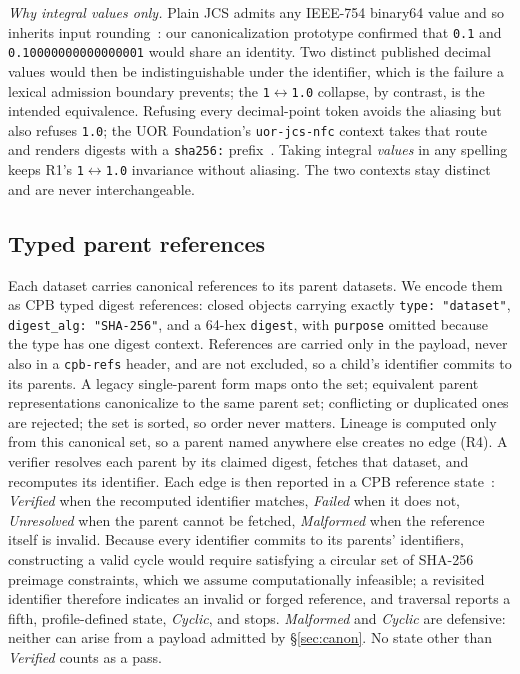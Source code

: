 \documentclass[conference]{IEEEtran}
\begin{document}
\emph{Why integral values only.} Plain JCS admits any IEEE-754 binary64 value and so inherits input rounding~\cite{rfc8785}: our canonicalization prototype confirmed that \texttt{0.1} and \texttt{0.10000000000000001} would share an identity. Two distinct published decimal values would then be indistinguishable under the identifier, which is the failure a lexical admission boundary prevents; the \texttt{1}$\leftrightarrow$\texttt{1.0} collapse, by contrast, is the intended equivalence. Refusing every decimal-point token avoids the aliasing but also refuses \texttt{1.0}; the UOR Foundation's \texttt{uor-jcs-nfc} context takes that route and renders digests with a \texttt{sha256:} prefix~\cite{uorjcsnfc}. Taking integral \emph{values} in any spelling keeps R1's \texttt{1}$\leftrightarrow$\texttt{1.0} invariance without aliasing. The two contexts stay distinct and are never interchangeable.

\subsection{Typed parent references}\label{sec:parents}
Each dataset carries canonical references to its parent datasets. We encode them as CPB typed digest references: closed objects carrying exactly \texttt{type: "dataset"}, \texttt{digest\_alg: "SHA-256"}, and a 64-hex \texttt{digest}, with \texttt{purpose} omitted because the type has one digest context. References are carried only in the payload, never also in a \texttt{cpb-refs} header, and are not excluded, so a child's identifier commits to its parents. A legacy single-parent form maps onto the set; equivalent parent representations canonicalize to the same parent set; conflicting or duplicated ones are rejected; the set is sorted, so order never matters. Lineage is computed only from this canonical set, so a parent named anywhere else creates no edge (R4). A verifier resolves each parent by its claimed digest, fetches that dataset, and recomputes its identifier. Each edge is then reported in a CPB reference state~\cite{cpb03}: \emph{Verified} when the recomputed identifier matches, \emph{Failed} when it does not, \emph{Unresolved} when the parent cannot be fetched, \emph{Malformed} when the reference itself is invalid. Because every identifier commits to its parents' identifiers, constructing a valid cycle would require satisfying a circular set of SHA-256 preimage constraints, which we assume computationally infeasible; a revisited identifier therefore indicates an invalid or forged reference, and traversal reports a fifth, profile-defined state, \emph{Cyclic}, and stops. \emph{Malformed} and \emph{Cyclic} are defensive: neither can arise from a payload admitted by \S\ref{sec:canon}. No state other than \emph{Verified} counts as a pass.
\end{document}
